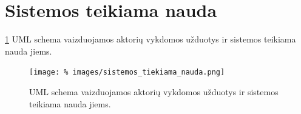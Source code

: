 \section{Sistemos teikiama nauda}

\ref{fig:uml_tasks2} UML schema vaizduojamos aktorių vykdomos užduotys 
ir sistemos teikiama nauda jiems.

\begin{figure}[h!]
  \begin{center}
    \texttt{[image: \%
    images/sistemos\_tiekiama\_nauda.png]}
  \end{center}
  \caption{UML schema vaizduojamos aktorių vykdomos užduotys ir sistemos 
    teikiama nauda jiems.}
  \label{fig:uml_tasks2}
\end{figure}
